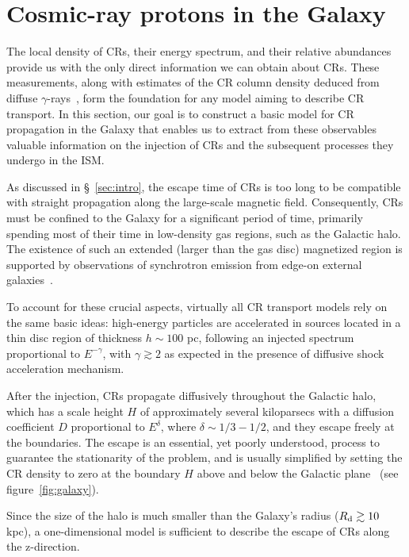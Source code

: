 \section{Cosmic-ray protons in the Galaxy}
\label{sec:protons}

The local density of CRs, their energy spectrum, and their relative abundances provide us with the only direct information we can obtain about CRs. These measurements, along with estimates of the CR column density deduced from diffuse $\gamma$-rays~\cite{Tibaldo2021universe, Grenier2015araa}, form the foundation for any model aiming to describe CR transport.
%
In this section, our goal is to construct a basic model for CR propagation in the Galaxy that enables us to extract from these observables valuable information on the injection of CRs and the subsequent processes they undergo in the ISM.

As discussed in \S~\ref{sec:intro}, the escape time of CRs is too long to be compatible with straight propagation along the large-scale magnetic field. Consequently, CRs must be confined to the Galaxy for a significant period of time, primarily spending most of their time in low-density gas regions, such as the Galactic halo.
%
The existence of such an extended (larger than the gas disc) magnetized region is supported by observations of synchrotron emission from edge-on external galaxies~\cite{Beck2015aar}.

To account for these crucial aspects, virtually all CR transport models rely on the same basic ideas: high-energy particles are accelerated in sources located in a thin disc region of thickness $h \sim 100$ pc, following an injected spectrum proportional to $E^{-\gamma}$, with $\gamma \gtrsim 2$ as expected in the presence of diffusive shock acceleration mechanism.

After the injection, CRs propagate diffusively throughout the Galactic halo, which has a scale height $H$ of approximately several kiloparsecs with a diffusion coefficient $D$ proportional to $E^\delta$, where $\delta \sim 1/3 - 1/2$, and they escape freely at the boundaries. The escape is an essential, yet poorly understood, process to guarantee the stationarity of the problem, and is usually simplified by setting the CR density to zero at the boundary $H$ above and below the Galactic plane~\cite{Ginzburg1980apss} (see figure~\ref{fig:galaxy}).

Since the size of the halo is much smaller than the Galaxy's radius ($R_{\rm d} \gtrsim 10$ kpc), a one-dimensional model is sufficient to describe the escape of CRs along the z-direction.

